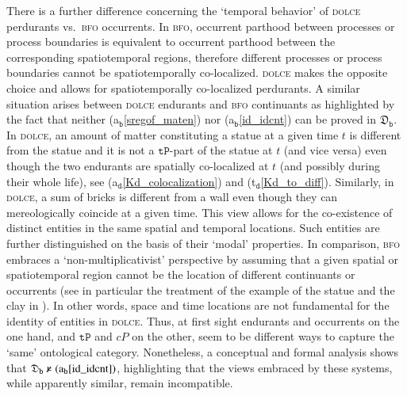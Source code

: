 \documentclass[ao]{iosart2x}
\newcommand{\nb}[1]{\textcolor{red}{$|$}\marginpar{\hspace*{-0cm}\parbox{20mm}{\scriptsize\raggedright\textcolor{red}{#1}}}}
\newcommand{\bfoAxLabel}{\textrm{a$_\texttt{b}$}}
\newcommand{\dolceAxLabel}{\textrm{a$_\texttt{d}$}}
\newcommand{\dolceThrLabel}{\textrm{t$_\texttt{d}$}}
\newcommand{\dbThrLabel}{\textrm{t$_\texttt{db}$}}
\newcommand{\refdolceax}[1]{({\dolceAxLabel}\ref{#1})}
\newcommand{\refdolceth}[1]{({\dolceThrLabel}\ref{#1})}
\newcommand{\refbfoax}[1]{({\bfoAxLabel}\ref{#1})}
\newcommand{\refdbth}[1]{({\dbThrLabel}\ref{#1})}
\newcommand{\pr}[1]{\mathtt{#1}}
\newcommand{\prbfo}[1]{{\textit{{#1}}}}
\newcommand{\dolce}{{\textsc{dolce}}}
\newcommand{\bfo}{{\textsc{bfo}}}
\newcommand {\thdolcedbmap} {\ensuremath{\mathfrak{D}_\texttt{b}}}
\newcommand {\TPd} {\ensuremath{\pr{tP}}}
\newcommand{\bfocpart}{\prbfo{cP}}
\newcommand{\bfostregof}{\prbfo{stREG}}
\begin{document}
There is a further difference concerning the `temporal behavior' of {\dolce} perdurants vs.~{\bfo} occurrents. %
In {\bfo}, occurrent parthood between processes or process boundaries is equivalent to occurrent parthood between the corresponding spatiotemporal regions, therefore different processes or process boundaries cannot be spatiotemporally co-localized. %
{\dolce} makes the opposite choice and allows for spatiotemporally co-localized perdurants. A similar situation arises between {\dolce} endurants and {\bfo} continuants as highlighted by the fact that neither \refbfoax{sregof_maten} nor \refbfoax{id_idcnt} can be proved in $\thdolcedbmap$. %
In {\dolce}, an amount of matter constituting a statue at a given time $t$ is different from the statue and it is not a $\TPd$-part of the statue at $t$ (and vice versa) even though the two endurants are spatially co-localized at $t$ (and possibly during their whole life), see \refdolceax{Kd_colocalization} and \refdolceth{Kd_to_diff}. Similarly, in {\dolce}, a sum of bricks is different from a wall even though they can mereologically coincide at a given time.
This view allows for the co-existence of distinct entities in the same spatial and temporal locations. Such entities are further distinguished on the basis of their `modal' properties. In comparison, {\bfo} embraces a `non-multiplicativist' perspective by assuming that a given spatial or spatiotemporal region cannot be the location of different continuants or occurrents (see in particular the treatment of the example of the statue and the clay in \citep{otte2022bfo}). In other words, space and time locations are not fundamental for the identity of entities in {\dolce}. %
Thus, at first sight endurants and occurrents on the one hand, and $\TPd$ and $\bfocpart$ on the other, seem to be different ways to capture the `same' ontological category. Nonetheless, a conceptual and formal analysis shows that ${\thdolcedbmap \nvDash \refbfoax{id_idcnt}}$, highlighting that the views embraced by these systems, while apparently similar, remain incompatible. %
\end{document}
